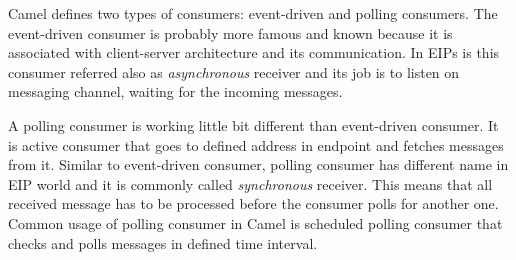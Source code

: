 \documentclass[12pt,final,oneside]{fithesis2}
\begin{document}
Camel defines two types of consumers: event-driven and polling consumers. The event-driven consumer is probably more famous and known because it is associated with client-server architecture and its communication. In EIPs is this consumer referred also as \textit{asynchronous} receiver and its job is to listen on messaging channel, waiting for the incoming messages.

A polling consumer is working little bit different than event-driven consumer. It is active consumer that goes to defined address in endpoint and fetches messages from it. Similar to event-driven consumer, polling consumer has different name in EIP world and it is commonly called \textit{synchronous} receiver. This means that all received message has to be processed before the consumer polls for another one. Common usage of polling consumer in Camel is scheduled polling consumer that checks and polls messages in defined time interval.


 
\end{document}
